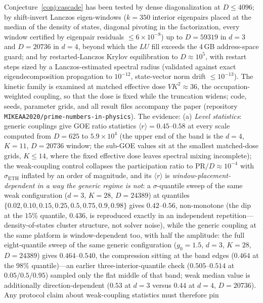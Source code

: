 \begin{remark}\label{rem:numerics}
Conjecture~\ref{conj:cascade} has been tested by dense diagonalization at $D\leq4096$; by
shift-invert Lanczos eigen-windows ($k=350$ interior eigenpairs placed at the median of the
density of states, diagonal pivoting in the factorization, every window certified by
eigenpair residuals $\leq6\times10^{-8}$) up to $D=59319$ in $d=3$ and $D=20736$ in $d=4$,
beyond which the $LU$ fill exceeds the 4\,GB address-space guard; and by
restarted-Lanczos Krylov equilibration to $D\approx10^{5}$, with restart steps sized by a
Lanczos-estimated spectral radius (validated against exact eigendecomposition propagation
to $10^{-12}$, state-vector norm drift $\leq10^{-13}$). The kinetic family is examined at
matched effective dose $VK^{2}\approx36$, the occupation-weighted coupling, so that the dose
is fixed while the truncation widens; code, seeds, parameter grids, and all result files
accompany the paper (repository \texttt{MIKEAA2020/prime-numbers-in-physics}). The evidence:
(a) \emph{Level statistics}: generic couplings give GOE ratio statistics
$\langle r\rangle=0.45$--$0.58$ at every scale computed from $D=625$ to
$5.9\times10^{4}$ (the upper end of the band is the $d=4$, $K=11$, $D=20736$ window; the
sub-GOE values sit at the smallest matched-dose grids, $K\leq14$, where the fixed effective
dose leaves spectral mixing incomplete); the weak-coupling control collapses the
participation ratio to
$\mathrm{PR}/D\approx10^{-4}$ with $\sigma_{\mathrm{ETH}}$ inflated by an order of
magnitude, and its $\langle r\rangle$ is \emph{window-placement-dependent in a way the
generic regime is not}: a $\sigma$-quantile sweep of the same weak configuration
($d=3$, $K=28$, $D=24389$) at quantiles $\{0.02,0.10,0.15,0.25,0.5,0.75,0.9,0.98\}$
gives $0.42$--$0.56$, non-monotone (the dip at the $15\%$ quantile, $0.436$, is reproduced
exactly in an independent repetition---density-of-states cluster structure, not solver
noise),
while the generic coupling at the same platform is window-dependent too, with half the
amplitude: the full eight-quantile sweep of the same generic configuration
($g_{0}=1.5$, $d=3$, $K=28$, $D=24389$) gives $0.464$--$0.540$, the compression sitting at
the band edges ($0.464$ at the $98\%$ quantile)---an earlier three-interior-quantile check
($0.505$--$0.514$ at $0.05/0.5/0.95$) sampled only the flat middle of that band;
weak median value is additionally direction-dependent ($0.53$ at $d=3$ versus $0.44$ at
$d=4$, $D=20736$). Any protocol claim about weak-coupling statistics must therefore pin

\end{remark}
